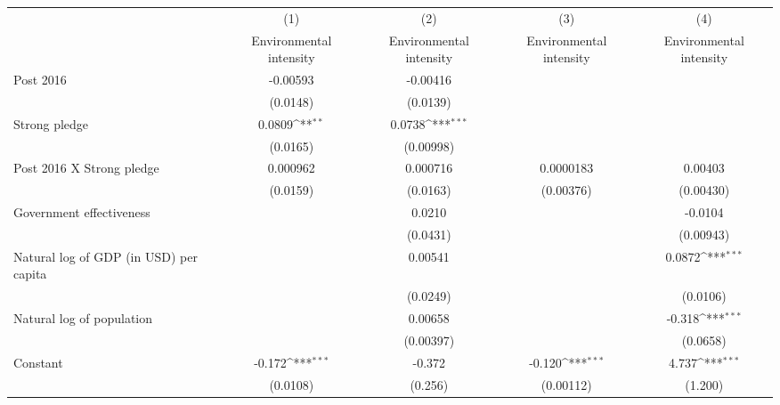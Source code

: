 {
\def\sym#1{\ifmmode^{#1}\else\(^{#1}\)\fi}
\begin{tabular}{l*{4}{c}}
\hline\hline
                    &\multicolumn{1}{c}{(1)}&\multicolumn{1}{c}{(2)}&\multicolumn{1}{c}{(3)}&\multicolumn{1}{c}{(4)}\\
                    &\multicolumn{1}{c}{Environmental intensity}&\multicolumn{1}{c}{Environmental intensity}&\multicolumn{1}{c}{Environmental intensity}&\multicolumn{1}{c}{Environmental intensity}\\
\hline
Post 2016           &    -0.00593         &    -0.00416         &                     &                     \\
                    &    (0.0148)         &    (0.0139)         &                     &                     \\
[1em]
Strong pledge       &      0.0809\sym{**} &      0.0738\sym{***}&                     &                     \\
                    &    (0.0165)         &   (0.00998)         &                     &                     \\
[1em]
Post 2016 X Strong pledge&    0.000962         &    0.000716         &   0.0000183         &     0.00403         \\
                    &    (0.0159)         &    (0.0163)         &   (0.00376)         &   (0.00430)         \\
[1em]
Government effectiveness&                     &      0.0210         &                     &     -0.0104         \\
                    &                     &    (0.0431)         &                     &   (0.00943)         \\
[1em]
Natural log of GDP (in USD) per capita&                     &     0.00541         &                     &      0.0872\sym{***}\\
                    &                     &    (0.0249)         &                     &    (0.0106)         \\
[1em]
Natural log of population&                     &     0.00658         &                     &      -0.318\sym{***}\\
                    &                     &   (0.00397)         &                     &    (0.0658)         \\
[1em]
Constant            &      -0.172\sym{***}&      -0.372         &      -0.120\sym{***}&       4.737\sym{***}\\
                    &    (0.0108)         &     (0.256)         &   (0.00112)         &     (1.200)         \\

\end{tabular}}
